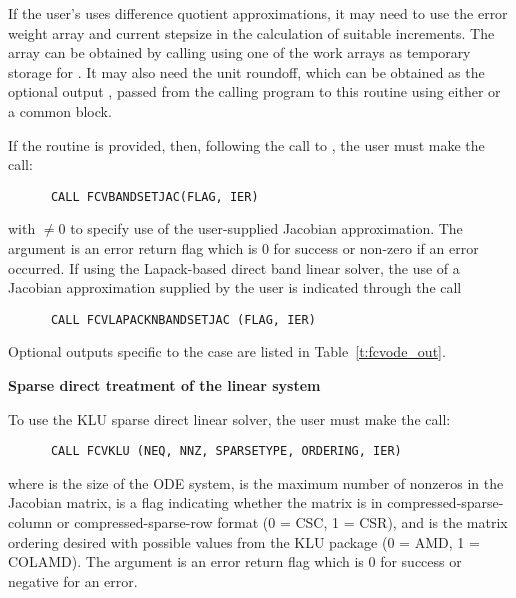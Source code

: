 \begin{Steps}
  If the user's  uses difference quotient approximations, it
  may need to use the error weight array  and current stepsize 
  in the calculation of suitable increments.  The array  can be
  obtained by calling  using one of the work arrays as
  temporary storage for .  It may also need the unit roundoff,
  which can be obtained as the optional output , passed from
  the calling program to this routine using either  or a common block.

  If the  routine is provided, then, following the call to ,
  the user must make the call:
\begin{verbatim}
      CALL FCVBANDSETJAC(FLAG, IER)
\end{verbatim}
  with  $\neq 0$ to specify use of the user-supplied Jacobian approximation.
  The argument  is an error return flag which is $0$ 
  for success or non-zero if an error occurred.
  If using the Lapack-based direct band linear solver, the use of a
  Jacobian approximation supplied by the user is indicated through the call
\begin{verbatim}
      CALL FCVLAPACKNBANDSETJAC (FLAG, IER)
\end{verbatim}

  Optional outputs specific to the {\band} case are listed in Table~\ref{t:fcvode_out}.

  
  {\bf Sparse direct treatment of the linear system}
  
  To use the KLU sparse direct linear solver,
  the user must make the call:
\begin{verbatim}
      CALL FCVKLU (NEQ, NNZ, SPARSETYPE, ORDERING, IER)
\end{verbatim}
  where  is the size of the ODE system, 
   is the maximum number of nonzeros in the Jacobian matrix,
   is a flag indicating whether the matrix is in
  compressed-sparse-column or compressed-sparse-row format (0 = CSC, 1
  = CSR), and  is the matrix ordering desired with possible values
  from the KLU package (0 = AMD, 1 = COLAMD).
  The argument  is an error return flag which is $0$ for success 
  or negative for an error.



\end{Steps}
